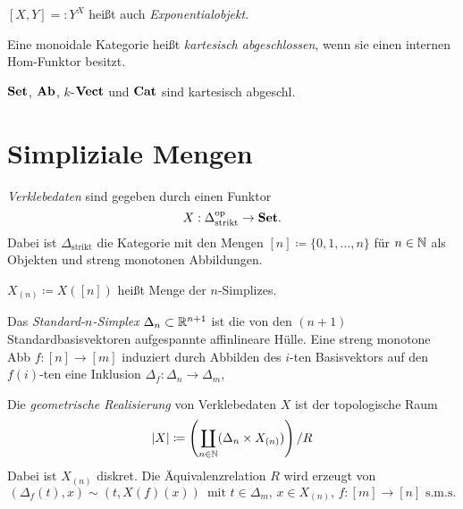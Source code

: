 \documentclass{cheat-sheet}
\begin{document}
\begin{nota}
  $[X, Y] =: Y^X$ heißt auch \emph{Exponentialobjekt}.
\end{nota}

\begin{defn}
  Eine monoidale Kategorie heißt \emph{kartesisch abgeschlossen}, wenn sie einen internen Hom-Funktor besitzt.
\end{defn}

\begin{bspe}
  $\mathbf{Set}$, $\mathbf{Ab}$, $k$-$\mathbf{Vect}$ und $\mathbf{Cat}$ sind kartesisch abgeschl.
\end{bspe}



\section{Simpliziale Mengen}


\begin{defn}
  \emph{Verklebedaten} sind gegeben durch einen Funktor
  \[ X : \Delta_{\text{strikt}}^{\mathrm{op}} \to \mathbf{Set}. \]
  Dabei ist $\Delta_{\text{strikt}}$ die Kategorie mit den Mengen
  $[n] \coloneqq \{ 0, 1, \ldots, n \}$ für $n \in \mathbb{N}$ als Objekten und streng monotonen Abbildungen.
\end{defn}

\begin{nota}
  $X_{(n)} \coloneqq X([n])$ heißt Menge der $n$-Simplizes.
\end{nota}

\begin{defn}
  Das \emph{Standard-$n$-Simplex} $\Delta_n \subset \mathbb{R}^{n+1}$ ist die von den $(n{+}1)$ Standardbasisvektoren aufgespannte affinlineare Hülle. Eine streng monotone Abb $f : [n] \to [m]$ induziert durch Abbilden des $i$-ten Basisvektors auf den $f(i)$-ten eine Inklusion $\Delta_f : \Delta_n \to \Delta_m$, 
\end{defn}

\begin{defn}
  Die \emph{geometrische Realisierung} von Verklebedaten $X$ ist der topologische Raum
  \[ \lvert X\rvert \coloneqq \left( \coprod_{n \in \mathbb{N}} (\Delta_n \times X_{(n)}) \right) / R \]
  Dabei ist $X_{(n)}$ diskret. Die Äquivalenzrelation $R$ wird erzeugt von
  \[
    (\Delta_f(t), x) \sim (t, X(f)(x)) \enspace
    \text{mit $t \in \Delta_m$, $x \in X_{(n)}$, $f : [m] {\to} [n]$ s.m.s.}
  \]
\end{defn}
\end{document}
